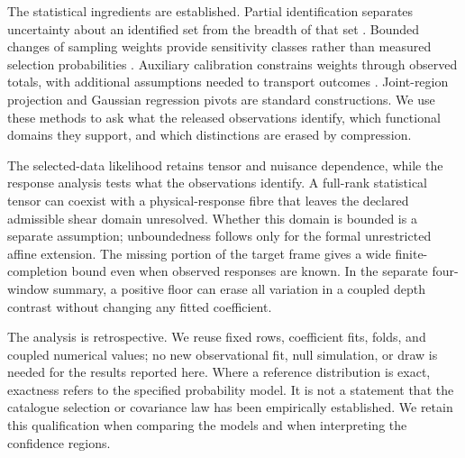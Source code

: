 The statistical ingredients are established. Partial identification separates uncertainty about an identified set from the breadth of that set \cite{ImbensManski2004}. Bounded changes of sampling weights provide sensitivity classes rather than measured selection probabilities \cite{AronowLee2013}. Auxiliary calibration constrains weights through observed totals, with additional assumptions needed to transport outcomes \cite{Deville1992}. Joint-region projection and Gaussian regression pivots are standard constructions. We use these methods to ask what the released observations identify, which functional domains they support, and which distinctions are erased by compression.

The selected-data likelihood retains tensor and nuisance dependence, while the response analysis tests what the observations identify. A full-rank statistical tensor can coexist with a physical-response fibre that leaves the declared admissible shear domain unresolved. Whether this domain is bounded is a separate assumption; unboundedness follows only for the formal unrestricted affine extension. The missing portion of the target frame gives a wide finite-completion bound even when observed responses are known. In the separate four-window summary, a positive floor can erase all variation in a coupled depth contrast without changing any fitted coefficient.

The analysis is retrospective. We reuse fixed rows, coefficient fits, folds, and coupled numerical values; no new observational fit, null simulation, or draw is needed for the results reported here. Where a reference distribution is exact, exactness refers to the specified probability model. It is not a statement that the catalogue selection or covariance law has been empirically established. We retain this qualification when comparing the models and when interpreting the confidence regions.
